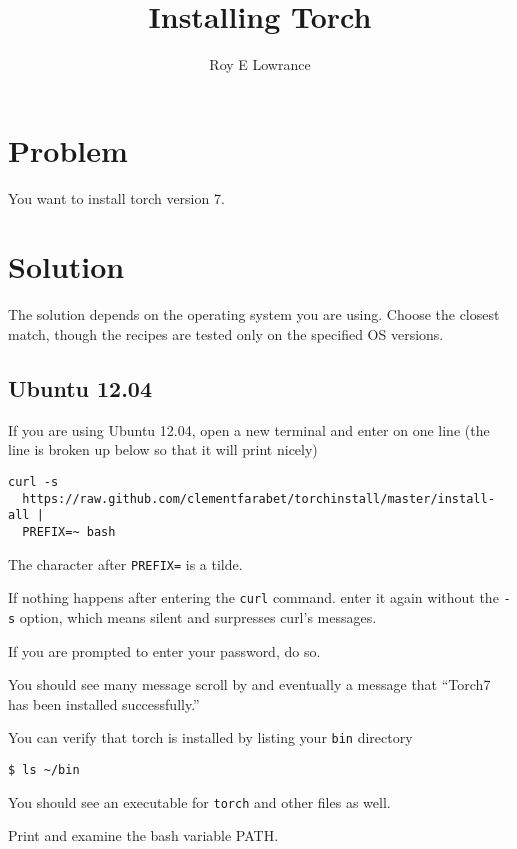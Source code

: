 \documentclass{article}
\let\code\texttt %
\begin{document}
\title{Installing Torch}
\author{Roy E Lowrance}
\maketitle


\section{Problem}
You want to install torch version 7.

\section{Solution}

The solution depends on the operating system you are using. Choose the
closest match, though the recipes are tested only on the specified OS
versions.

\subsection{Ubuntu 12.04}

If you are using Ubuntu 12.04, open a new terminal and enter on one line
(the line is broken up below so that it will print nicely)

\begin{verbatim}
curl -s
  https://raw.github.com/clementfarabet/torchinstall/master/install-all | 
  PREFIX=~ bash
\end{verbatim}

The character after \code{PREFIX=} is a tilde.

If nothing happens after entering the \code{curl} command. enter it
again without the \code{-s} option, which means silent and surpresses
curl's messages.

If you are prompted to enter your password, do so.

You should see many message scroll by and eventually a message that ``Torch7 has
been installed successfully.''

You can verify that torch is installed by listing your \code{bin} directory

\begin{verbatim}
$ ls ~/bin
\end{verbatim}

You should see an executable for \code{torch} and other files as well.

Print and examine the bash variable PATH.
\end{document}
